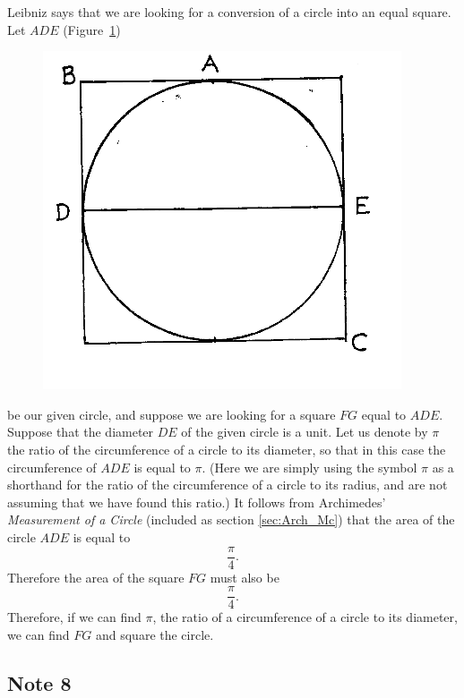 \documentclass[twoside,openright]{article}
\begin{document}
Leibniz says that we are looking for a conversion of a circle into an
equal square.  Let $ADE$ (Figure~\ref{circsquare})
\begin{figure}[htp]
  \begin{center}
    \includegraphics[width=.5\textwidth]{fig/Figure58}
    \caption{}
    \label{circsquare}
    \vspace{-10pt}
  \end{center}
\end{figure} be our given circle, and suppose we are looking for a
square $FG$ equal to $ADE$.  Suppose that the diameter $DE$ of the
given circle is a unit.  Let us denote by $\pi$ the ratio of the
circumference of a circle to its diameter, so that in this case the
circumference of $ADE$ is equal to $\pi$.  (Here we are simply using
the symbol $\pi$ as a shorthand for the ratio of the circumference of
a circle to its radius, and are not assuming that we have found this
ratio.)  It follows from Archimedes' {\em Measurement of a Circle}
(included as section \ref{sec:Arch_Mc}) that the area of the circle $ADE$
is equal to
$$\frac{\pi}{4}.$$
Therefore the area of the square $FG$ must also be 
$$\frac{\pi}{4}.$$
Therefore, if we can find $\pi$, the ratio of a circumference of a
circle to its diameter, we can find $FG$ and square the circle.

\subsection*{Note 8}
\label{ctp8}
\end{document}

